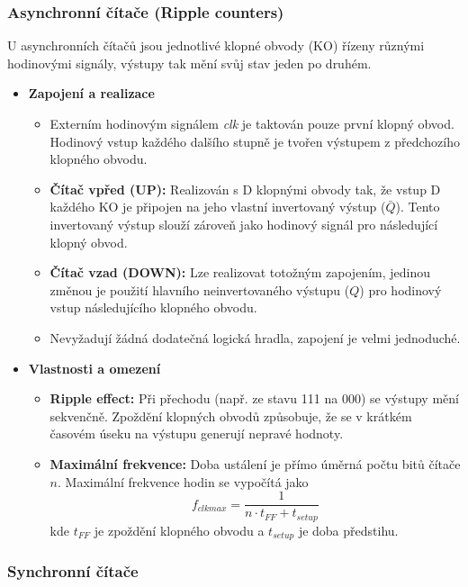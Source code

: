     \subsubsection{Asynchronní čítače (Ripple counters)}
        U asynchronních čítačů jsou jednotlivé klopné obvody (KO) řízeny různými hodinovými signály, výstupy tak mění svůj stav jeden po druhém.
        \begin{itemize}
            \item \textbf{Zapojení a realizace}
            \begin{itemize}
                \item Externím hodinovým signálem \textit{clk} je taktován pouze první klopný obvod. Hodinový vstup každého dalšího stupně je tvořen výstupem z předchozího klopného obvodu.
                \item \textbf{Čítač vpřed (UP):} Realizován s D klopnými obvody tak, že vstup D každého KO je připojen na jeho vlastní invertovaný výstup ($\bar{Q}$). Tento invertovaný výstup slouží zároveň jako hodinový signál pro následující klopný obvod.
                \item \textbf{Čítač vzad (DOWN):} Lze realizovat totožným zapojením, jedinou změnou je použití hlavního neinvertovaného výstupu ($Q$) pro hodinový vstup následujícího klopného obvodu.
                \item Nevyžadují žádná dodatečná logická hradla, zapojení je velmi jednoduché.
            \end{itemize}
        
            \item \textbf{Vlastnosti a omezení}
            \begin{itemize}
                \item \textbf{Ripple effect:} Při přechodu (např. ze stavu 111 na 000) se výstupy mění sekvenčně. Zpoždění klopných obvodů způsobuje, že se v krátkém časovém úseku na výstupu generují nepravé hodnoty.
                \item \textbf{Maximální frekvence:} Doba ustálení je přímo úměrná počtu bitů čítače $n$. Maximální frekvence hodin se vypočítá jako $$f_{clkmax} = \frac{1}{n \cdot t_{FF} + t_{setup}}$$ kde $t_{FF}$ je zpoždění klopného obvodu a $t_{setup}$ je doba předstihu.
            \end{itemize}
        \end{itemize}
    \subsubsection{Synchronní čítače}

